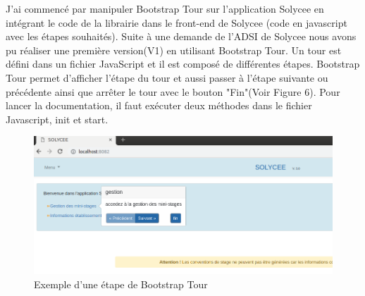 \documentclass[12pt]{article}
\begin{document}
J'ai commencé par manipuler Bootstrap Tour sur l'application Solycee en intégrant le code de la librairie dans le front-end de Solycee (code en javascript avec les étapes souhaités). Suite à une demande de l'ADSI de Solycee nous avons pu réaliser une première version(V1) en utilisant Bootstrap Tour. Un tour est défini dans un fichier JavaScript et il est composé de différentes étapes. Bootstrap Tour permet d'afficher l'étape du tour et aussi passer à l'étape suivante ou précédente ainsi que arrêter le tour avec le bouton "Fin"(Voir Figure 6). Pour lancer la documentation, il faut exécuter deux méthodes dans le fichier Javascript, init et start. 
\begin{figure}[H]
	\centering
 		\includegraphics[width=1\textwidth]{diagrammes/exemple_Tour.png} 
  		\caption{Exemple d'une étape de Bootstrap Tour}
	\end{figure}
\end{document}
